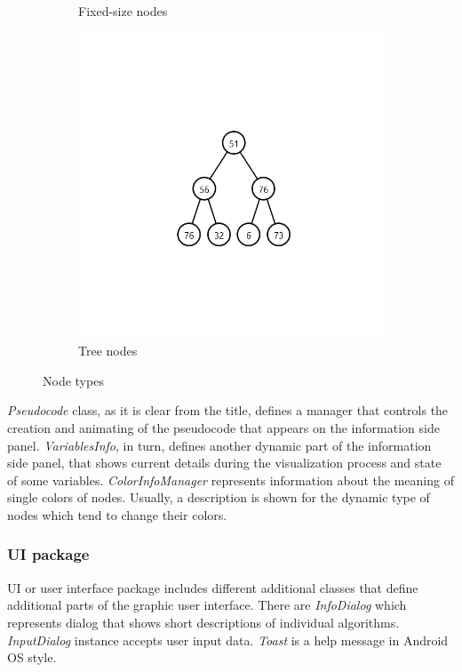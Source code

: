 \documentclass[
  field=inf,
  biblatex,
  language=english,
  glossaries,
  theorems=false,
  index
]{kidiplom}
\begin{document}
\begin{figure}[H]
\begin{subfigure}{0.31\textwidth}
		\caption{Fixed-size nodes} \label{fig:1b}
	\end{subfigure}
	\hspace*{\fill} %
	\begin{subfigure}{0.31\textwidth}
		\includegraphics[width=\linewidth]{img/tree.png}
		\caption{Tree nodes} \label{fig:1c}
	\end{subfigure}
	\caption{Node types} \label{fig:1}
\end{figure}

\textit{Pseudocode} class, as it is clear from the title, defines a manager that controls the creation and animating of the pseudocode that appears on the information side panel. \textit{VariablesInfo}, in turn, defines another dynamic part of the information side panel, that shows current details during the visualization process and state of some variables. \textit{ColorInfoManager} represents information about the meaning of single colors of nodes. Usually, a description is shown for the dynamic type of nodes which tend to change their colors.

\subsubsection{UI package}
UI or user interface package includes different additional classes that define additional parts of the graphic user interface. There are \textit{InfoDialog} which represents dialog that shows short descriptions of individual algorithms. \textit{InputDialog} instance accepts user input data. \textit{Toast} is a help message in Android OS style.
\end{document}
